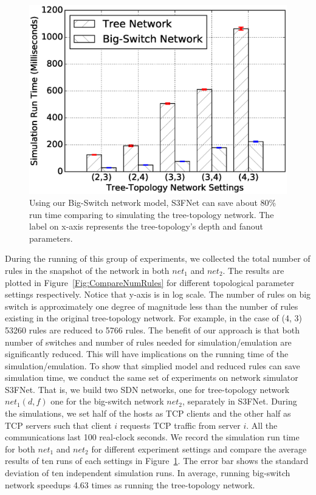 \begin{figure}[h]
\centering
\includegraphics[scale=.42]{figures/comp_sim_time.eps}
\caption{Using our Big-Switch network model, S3FNet can save about 80\% run time
        comparing to simulating the tree-topology network.
        The label on x-axis represents the tree-topology's depth and fanout parameters.}
\label{Fig:CompareSimulationTime}
\end{figure}

During the running of this group of experiments,
we collected the total number of rules in the snapshot of the network in both $net_1$
and $net_2$.
The results are plotted in Figure~\ref{Fig:CompareNumRules} for different
topological parameter settings respectively.
Notice that y-axis is in log scale.
The number of rules on big switch is approximately one degree of magnitude less
than the number of rules existing in the original tree-topology network.
For example, in the case of (4, 3) 53260 rules are reduced to 5766 rules.
The benefit of our approach is that both number of switches and number of rules needed
for simulation/emulation are significantly reduced.
This will have implications on the running time of the simulation/emulation.
To show that simplied model and reduced rules can save simulation time, we conduct
the same set of experiments on network simulator S3FNet\cite{S3F}.
That is, we build two SDN networks, one for tree-topology network $net_1(d, f)$
one for the big-switch network $net_2$, separately in S3FNet.
During the simulations, we set half of the hosts as TCP clients
and the other half as TCP servers such that client $i$ requests TCP traffic from server $i$.
All the communications last 100 real-clock seconds.
We record the simulation run time for both $net_1$ and $net_2$ for different experiment
settings and compare the average results of ten runs of each settings
in Figure~\ref{Fig:CompareSimulationTime}.
The error bar shows the standard deviation of ten independent simulation runs.
In average, running big-switch network speedups 4.63 times as
running the tree-topology network.


